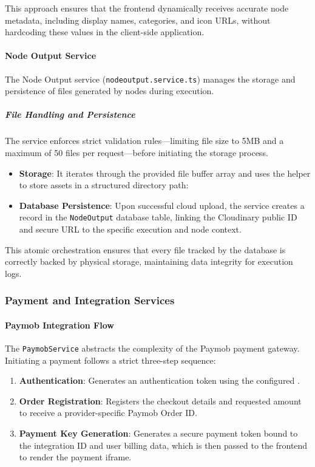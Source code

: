 This approach ensures that the frontend dynamically receives accurate node metadata, including display names, categories, and icon URLs, without hardcoding these values in the client-side application.

\paragraph{Node Output Service}
The Node Output service (\texttt{nodeoutput.service.ts}) manages the storage and persistence of files generated by nodes during execution.

\subparagraph{File Handling and Persistence}
The service enforces strict validation rules—limiting file size to 5MB and a maximum of 50 files per request—before initiating the storage process.

\begin{itemize}
    \item \textbf{Storage}: It iterates through the provided file buffer array and uses the \texttt{} helper to store assets in a structured directory path: \texttt{}
    \item \textbf{Database Persistence}: Upon successful cloud upload, the service creates a record in the \texttt{NodeOutput} database table, linking the Cloudinary public ID and secure URL to the specific execution and node context.
\end{itemize}

This atomic orchestration ensures that every file tracked by the database is correctly backed by physical storage, maintaining data integrity for execution logs.


\subsubsection{Payment and Integration Services}

\paragraph{Paymob Integration Flow}
The \texttt{PaymobService} abstracts the complexity of the Paymob payment gateway. Initiating a payment follows a strict three-step sequence:
\begin{enumerate}
    \item \textbf{Authentication}: Generates an authentication token using the configured \texttt{}.
    \item \textbf{Order Registration}: Registers the checkout details and requested amount to receive a provider-specific Paymob Order ID.
    \item \textbf{Payment Key Generation}: Generates a secure payment token bound to the integration ID and user billing data, which is then passed to the frontend to render the payment iframe.
\end{enumerate}

